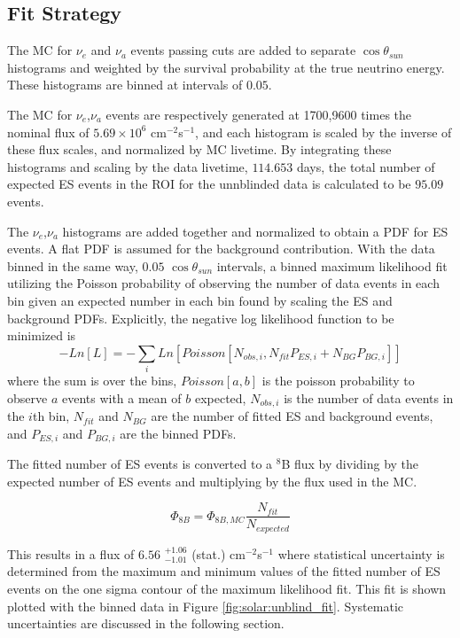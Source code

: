 \subsection{Fit Strategy}
\label{sec:solar:fit_strategy}

The MC for $\nu_e$ and $\nu_a$ events passing cuts are added to separate
$\cos{\theta_{sun}}$ histograms and weighted by the survival probability at the
true neutrino energy.
These histograms are binned at intervals of $0.05$.

The MC for $\nu_e$,$\nu_a$ events are respectively generated at 1700,9600 times
the nominal flux of $5.69\times10^{6}$ cm$^{-2}$s$^{-1}$, and each histogram is
scaled by the inverse of these flux scales, and normalized by MC livetime.
By integrating these histograms and scaling by the data livetime, $114.653$ days,
the total number of expected ES events in the ROI for the unnblinded data is 
calculated to be $95.09$ events.

The $\nu_e$,$\nu_a$ histograms are added together and normalized to obtain a PDF
for ES events.
A flat PDF is assumed for the background contribution.
With the data binned in the same way, $0.05$ $\cos{\theta_{sun}}$ intervals, a
binned maximum likelihood fit utilizing the Poisson probability of observing the 
number of data events in each bin given an expected number in each bin found by 
scaling the ES and background PDFs.
Explicitly, the negative log likelihood function to be minimized is
\begin{equation}
-Ln[L] = -\sum_i Ln[Poisson\left[N_{obs,i},N_{fit} P_{ES,i}+ N_{BG} P_{BG,i}\right]]
\end{equation}
where the sum is over the bins,  $Poisson[a,b]$ is the poisson probability to 
observe $a$ events with a  mean of $b$ expected, $N_{obs,i}$ is the number of 
data events in the $i$th bin, $N_{fit}$ and $N_{BG}$ are the number of fitted 
ES and background events, and $P_{ES,i}$ and $P_{BG,i}$ are the binned PDFs.

The fitted number of ES events is converted to a $^8$B flux by dividing by the 
expected number of ES events and multiplying by the flux used in the MC.

\begin{equation}
\Phi_{8B} = \Phi_{8B,MC}\frac{N_{fit}}{N_{expected}}
\end{equation}

This results in a flux of $6.56$ $^{+1.06}_{-1.01}$ (stat.) cm$^{-2}$s$^{-1}$
where statistical uncertainty is determined from the maximum and minimum values
of the fitted number of ES events on the one sigma contour of the maximum 
likelihood fit.
This fit is shown plotted with the binned data in Figure 
\ref{fig:solar:unblind_fit}.
Systematic uncertainties are discussed in the following section.

